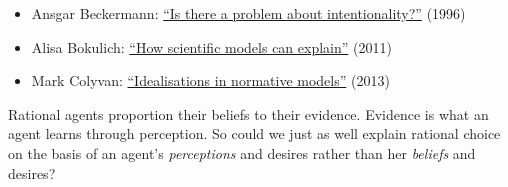 \begin{itemize}
  \itemsep0em 

\item Ansgar Beckermann:
  \href{https://www.uni-bielefeld.de/(en)/philosophie/personen/beckermann/pbint_ve.pdf}{``Is
    there a problem about intentionality?''} (1996)

\item Alisa Bokulich: \href{http://www.romanfrigg.org/Links/MS2/Bokulich.pdf}{``How scientific models can explain''} (2011)

\item Mark Colyvan: \href{http://www.colyvan.com/papers/iinm.pdf}{``Idealisations in normative models''} (2013)

  
\end{itemize}

\begin{essay}
  Rational agents proportion their beliefs to their evidence. Evidence
  is what an agent learns through perception. So could we just as well
  explain rational choice on the basis of an agent's
  \emph{perceptions} and desires rather than her \emph{beliefs} and
  desires?
\end{essay}



